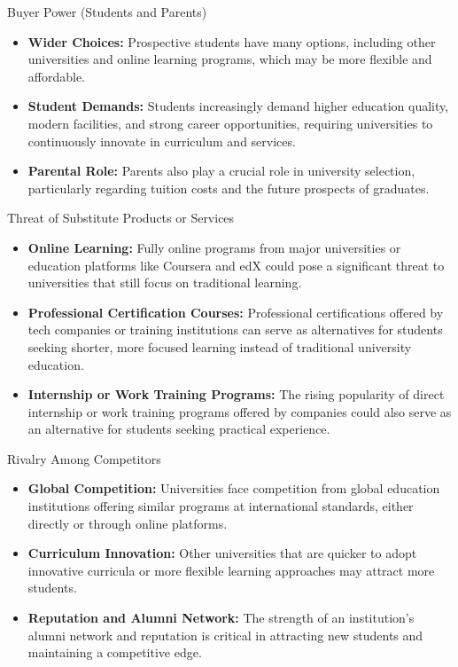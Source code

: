 \documentclass[aspectratio=169, table]{beamer}
\begin{document}
\begin{frame}{Buyer Power (Students and Parents)}
	\begin{itemize}
		\item \textbf{Wider Choices:} Prospective students have many options, including other universities and online learning programs, which may be more flexible and affordable.
		\item \textbf{Student Demands:} Students increasingly demand higher education quality, modern facilities, and strong career opportunities, requiring universities to continuously innovate in curriculum and services.
		\item \textbf{Parental Role:} Parents also play a crucial role in university selection, particularly regarding tuition costs and the future prospects of graduates.
	\end{itemize}
\end{frame}

\begin{frame}{Threat of Substitute Products or Services}
	\begin{itemize}
		\item \textbf{Online Learning:} Fully online programs from major universities or education platforms like Coursera and edX could pose a significant threat to universities that still focus on traditional learning.
		\item \textbf{Professional Certification Courses:} Professional certifications offered by tech companies or training institutions can serve as alternatives for students seeking shorter, more focused learning instead of traditional university education.
		\item \textbf{Internship or Work Training Programs:} The rising popularity of direct internship or work training programs offered by companies could also serve as an alternative for students seeking practical experience.
	\end{itemize}
\end{frame}

\begin{frame}{Rivalry Among Competitors}
	\begin{itemize}
		\item \textbf{Global Competition:} Universities face competition from global education institutions offering similar programs at international standards, either directly or through online platforms.
		\item \textbf{Curriculum Innovation:} Other universities that are quicker to adopt innovative curricula or more flexible learning approaches may attract more students.
		\item \textbf{Reputation and Alumni Network:} The strength of an institution's alumni network and reputation is critical in attracting new students and maintaining a competitive edge.
	\end{itemize}
\end{frame}
\end{document}
